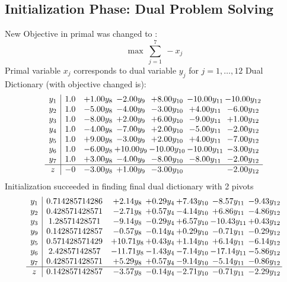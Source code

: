 \documentclass[8pt]{article}
\begin{document}
\subsection{Initialization Phase: Dual Problem Solving}
New Objective in primal was changed to : \[ \max\ \sum_{j=1}^{7}\ - x_j \] 
Primal variable $x_j$ corresponds to dual variable $y_j$ for $j = 1,\ldots,12$
Dual Dictionary (with objective changed is): 
\[\begin{array}{c| c c@{\hskip 2pt} c@{\hskip 2pt} c@{\hskip 2pt} c@{\hskip 2pt} c@{\hskip 2pt} }
 y_{1}   &  1.0 & +  1.00 y_{8} & -2.00 y_{9} & +  8.00 y_{10} & -10.00 y_{11} & -10.00 y_{12}\\
 y_{2}   &  1.0 & -5.00 y_{8} & -4.00 y_{9} & -3.00 y_{10} & +  4.00 y_{11} & -6.00 y_{12}\\
 y_{3}   &  1.0 & -8.00 y_{8} & +  2.00 y_{9} & +  6.00 y_{10} & -9.00 y_{11} & +  1.00 y_{12}\\
 y_{4}   &  1.0 & -4.00 y_{8} & -7.00 y_{9} & +  2.00 y_{10} & -5.00 y_{11} & -2.00 y_{12}\\
 y_{5}   &  1.0 & +  9.00 y_{8} & -3.00 y_{9} & +  2.00 y_{10} & +  4.00 y_{11} & -7.00 y_{12}\\
 y_{6}   &  1.0 & -6.00 y_{8} & + 10.00 y_{9} & -10.00 y_{10} & -10.00 y_{11} & -3.00 y_{12}\\
 y_{7}   &  1.0 & +  3.00 y_{8} & -4.00 y_{9} & -8.00 y_{10} & -8.00 y_{11} & -2.00 y_{12}\\
\hline
z    &  -0 & -3.00 y_{8} & +  1.00 y_{9} & -3.00 y_{10} &   & -2.00 y_{12}\\
\end{array}\]
Initialization succeeded in finding final dual dictionary with 2 pivots
\[\begin{array}{c| c c@{\hskip 2pt} c@{\hskip 2pt} c@{\hskip 2pt} c@{\hskip 2pt} c@{\hskip 2pt} }
 y_{1}   &  0.714285714286 & +  2.14 y_{8} & +  0.29 y_{4} & +  7.43 y_{10} & -8.57 y_{11} & -9.43 y_{12}\\
 y_{2}   &  0.428571428571 & -2.71 y_{8} & +  0.57 y_{4} & -4.14 y_{10} & +  6.86 y_{11} & -4.86 y_{12}\\
 y_{3}   &  1.28571428571 & -9.14 y_{8} & -0.29 y_{4} & +  6.57 y_{10} & -10.43 y_{11} & +  0.43 y_{12}\\
 y_{9}   &  0.142857142857 & -0.57 y_{8} & -0.14 y_{4} & +  0.29 y_{10} & -0.71 y_{11} & -0.29 y_{12}\\
 y_{5}   &  0.571428571429 & + 10.71 y_{8} & +  0.43 y_{4} & +  1.14 y_{10} & +  6.14 y_{11} & -6.14 y_{12}\\
 y_{6}   &  2.42857142857 & -11.71 y_{8} & -1.43 y_{4} & -7.14 y_{10} & -17.14 y_{11} & -5.86 y_{12}\\
 y_{7}   &  0.428571428571 & +  5.29 y_{8} & +  0.57 y_{4} & -9.14 y_{10} & -5.14 y_{11} & -0.86 y_{12}\\
\hline
z    &  0.142857142857 & -3.57 y_{8} & -0.14 y_{4} & -2.71 y_{10} & -0.71 y_{11} & -2.29 y_{12}\\
\end{array}\]
\end{document}
